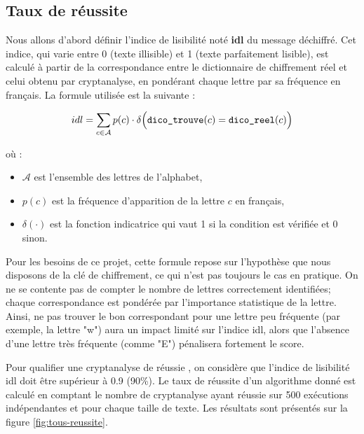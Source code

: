 \documentclass[a4paper]{article}
\begin{document}
\subsection{Taux de réussite}
\label{sec:Taux_de_réussite}

Nous allons d'abord définir l'indice de lisibilité noté \textbf{idl} du message déchiffré. Cet indice, qui varie entre 0 (texte illisible) et 1 (texte parfaitement lisible), est calculé à partir de la correspondance entre le dictionnaire de chiffrement réel et celui obtenu par cryptanalyse, en pondérant chaque lettre par sa fréquence en français. 
La formule utilisée est la suivante :

\[
idl = \sum_{c \in \mathcal{A}} p(c) \cdot \delta\Bigl(\texttt{dico\_trouve}(c) = \texttt{dico\_reel}(c)\Bigr)
\]


où :
\begin{itemize}
  \item \(\mathcal{A}\) est l'ensemble des lettres de l'alphabet,
  \item \(p(c)\) est la fréquence d'apparition de la lettre \(c\) en français,
  \item \(\delta(\cdot)\) est la fonction indicatrice qui vaut 1 si la condition est vérifiée et 0 sinon.
\end{itemize}

Pour les besoins de ce projet, cette formule repose sur l'hypothèse que nous disposons de la clé de chiffrement, ce qui n'est pas toujours le cas en pratique.
On ne se contente pas de compter le nombre de lettres correctement identifiées; chaque correspondance est pondérée par l'importance statistique de la lettre. Ainsi, ne pas trouver le bon correspondant pour une lettre peu fréquente (par exemple, la lettre "w") aura un impact limité sur l'indice idl, alors que l'absence d'une lettre très fréquente (comme "E") pénalisera fortement le score.

Pour qualifier une cryptanalyse de \og réussie \fg{}, on considère que l'indice de lisibilité idl doit être supérieur à 0.9 (90\%). Le taux de réussite d'un algorithme donné est calculé en comptant le nombre de cryptanalyse ayant \og réussie \fg{} sur 500 exécutions indépendantes et pour chaque taille de texte. Les résultats sont présentés sur la figure \ref{fig:tous-reussite}.
\end{document}
